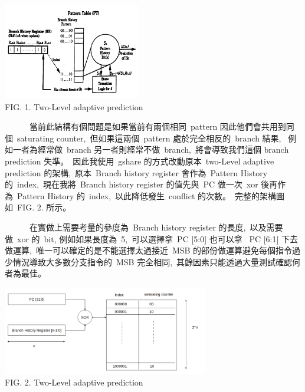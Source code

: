 \documentclass{article}
\begin{document}
\begin{CJK*}{UTF8}{bsmi}
\begin{multicols}{2}
\begin{center}
    \includegraphics[width=6cm]{two_level}\\
    \footnotesize FIG. 1. Two-Level adaptive prediction
\end{center}

\begin{flushleft}
    \ \ \ \ \ \ 當前此結構有個問題是如果當前有兩個相同\ pattern 因此他們會共用到同個\ saturating counter,\
    但如果這兩個\ pattern 處於完全相反的\ branch 結果, \
    例如一者為經常做\ branch 另一者則經常不做\ branch,\
    將會導致我們這個 branch prediction 失準。\
    因此我使用\ gshare 的方式改動原本\ two-Level adaptive prediction 的架構,\
    原本\ Branch history register 會作為\ Pattern History 的\ index,\
    現在我將\ Branch history register 的值先與\ PC 做一次\ xor 後再作為\ Pattern History 的\ index,\
    以此降低發生\ conflict 的次數。\
    完整的架構圖如\ FIG. 2. 所示。\newline

    \ \ \ \ \ \ 在實做上需要考量的參度為\ Branch history register 的長度,\
    以及需要做\ xor 的\ bit, 例如如果長度為\ 5,\
    可以選擇拿\ PC [5:0] 也可以拿 \ PC [6:1] 下去做運算,\
    唯一可以確定的是不能選擇太過接近\ MSB 的部份做運算避免每個指令過少情況導致大多數分支指令的\ MSB 完全相同,\
    其餘因素只能透過大量測試確認何者為最佳。\
\end{flushleft}

\columnbreak

\begin{center}
    \includegraphics[width=9cm]{two_level_02}\\
    \footnotesize FIG. 2. Two-Level adaptive prediction
\end{center}


\end{multicols}
\end{CJK*}
\end{document}
